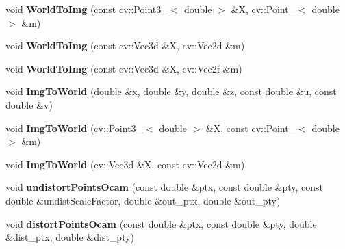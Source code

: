 \begin{DoxyCompactItemize}
\item 
void {\bfseries World\+To\+Img} (const cv\+::\+Point3\+\_\+$<$ double $>$ \&X, cv\+::\+Point\+\_\+$<$ double $>$ \&m)\hypertarget{classMultiColSLAM_1_1cCamModelGeneral___a6e3d31b5b392da4d04283e1812668a97}{}\label{classMultiColSLAM_1_1cCamModelGeneral___a6e3d31b5b392da4d04283e1812668a97}

\item 
void {\bfseries World\+To\+Img} (const cv\+::\+Vec3d \&X, cv\+::\+Vec2d \&m)\hypertarget{classMultiColSLAM_1_1cCamModelGeneral___a4c682786d019d89156ef87574b4bfca0}{}\label{classMultiColSLAM_1_1cCamModelGeneral___a4c682786d019d89156ef87574b4bfca0}

\item 
void {\bfseries World\+To\+Img} (const cv\+::\+Vec3d \&X, cv\+::\+Vec2f \&m)\hypertarget{classMultiColSLAM_1_1cCamModelGeneral___a3666d308b6a8eac58d4aed94b3b8f96a}{}\label{classMultiColSLAM_1_1cCamModelGeneral___a3666d308b6a8eac58d4aed94b3b8f96a}

\item 
void {\bfseries Img\+To\+World} (double \&x, double \&y, double \&z, const double \&u, const double \&v)\hypertarget{classMultiColSLAM_1_1cCamModelGeneral___acd01f911ab2dbc9d6efe21e7029bb0f5}{}\label{classMultiColSLAM_1_1cCamModelGeneral___acd01f911ab2dbc9d6efe21e7029bb0f5}

\item 
void {\bfseries Img\+To\+World} (cv\+::\+Point3\+\_\+$<$ double $>$ \&X, const cv\+::\+Point\+\_\+$<$ double $>$ \&m)\hypertarget{classMultiColSLAM_1_1cCamModelGeneral___aa845ee27b52be3b79fa060d5ce1bfc02}{}\label{classMultiColSLAM_1_1cCamModelGeneral___aa845ee27b52be3b79fa060d5ce1bfc02}

\item 
void {\bfseries Img\+To\+World} (cv\+::\+Vec3d \&X, const cv\+::\+Vec2d \&m)\hypertarget{classMultiColSLAM_1_1cCamModelGeneral___abd2ddb40da2b6c676d17353b3297d608}{}\label{classMultiColSLAM_1_1cCamModelGeneral___abd2ddb40da2b6c676d17353b3297d608}

\item 
void {\bfseries undistort\+Points\+Ocam} (const double \&ptx, const double \&pty, const double \&undist\+Scale\+Factor, double \&out\+\_\+ptx, double \&out\+\_\+pty)\hypertarget{classMultiColSLAM_1_1cCamModelGeneral___a6ffc49b9df96a97ef05e2614da1d5cf7}{}\label{classMultiColSLAM_1_1cCamModelGeneral___a6ffc49b9df96a97ef05e2614da1d5cf7}

\item 
void {\bfseries distort\+Points\+Ocam} (const double \&ptx, const double \&pty, double \&dist\+\_\+ptx, double \&dist\+\_\+pty)\hypertarget{classMultiColSLAM_1_1cCamModelGeneral___a1a259eb069f68cd26c211a155c02aef0}{}\label{classMultiColSLAM_1_1cCamModelGeneral___a1a259eb069f68cd26c211a155c02aef0}


\end{DoxyCompactItemize}
